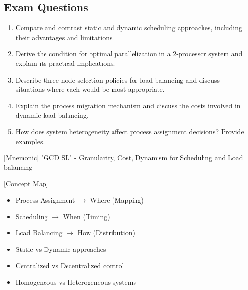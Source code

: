 \documentclass[12pt]{article}
\begin{document}
\subsection*{Exam Questions}
\begin{enumerate}
  \item Compare and contrast static and dynamic scheduling approaches, including their advantages and limitations.

  \item Derive the condition for optimal parallelization in a 2-processor system and explain its practical implications.

  \item Describe three node selection policies for load balancing and discuss situations where each would be most appropriate.

  \item Explain the process migration mechanism and discuss the costs involved in dynamic load balancing.

  \item How does system heterogeneity affect process assignment decisions? Provide examples.
\end{enumerate}

[Mnemonic] "GCD SL" - Granularity, Cost, Dynamism for Scheduling and Load balancing

  [Concept Map]
\begin{itemize}
  \item Process Assignment $\rightarrow$ Where (Mapping)
  \item Scheduling $\rightarrow$ When (Timing)
  \item Load Balancing $\rightarrow$ How (Distribution)
  \item Static vs Dynamic approaches
  \item Centralized vs Decentralized control
  \item Homogeneous vs Heterogeneous systems
\end{itemize}
\end{document}
